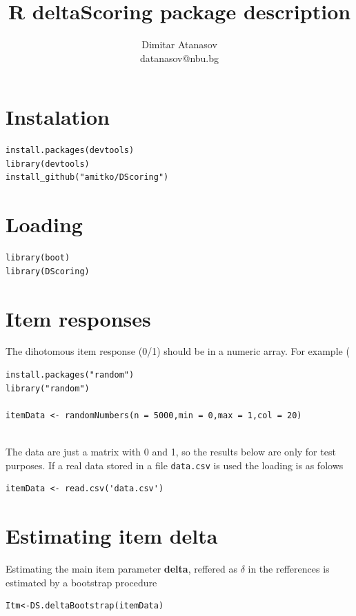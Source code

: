 \documentclass[10pt,a4paper]{article}
\begin{document}
\title{R deltaScoring package description}
\author{Dimitar Atanasov\\ datanasov@nbu.bg}

\maketitle

\section{Instalation}
\begin{lstlisting}
install.packages(devtools)
library(devtools)
install_github("amitko/DScoring")
\end{lstlisting}

\section{Loading}
\begin{lstlisting}
library(boot)
library(DScoring)
\end{lstlisting}

\section{Item responses}
The dihotomous item response (0/1) should be in a numeric array. For example (
\begin{lstlisting}
install.packages("random")  
library("random")

itemData <- randomNumbers(n = 5000,min = 0,max = 1,col = 20) 
 
\end{lstlisting}

The data are just a matrix with 0 and 1, so the results below are only for test purposes. If a real data stored in a file {\tt data.csv} is used the loading is as folows
\begin{lstlisting}
itemData <- read.csv('data.csv')
\end{lstlisting}

\section{Estimating item delta}
Estimating the main item parameter {\bf delta}, reffered as $\delta$  in the refferences is estimated by a bootstrap procedure
\begin{lstlisting}
Itm<-DS.deltaBootstrap(itemData) 
\end{lstlisting}
\end{document}
